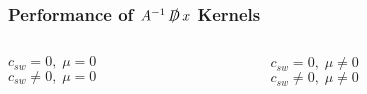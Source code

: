 \documentclass{beamer}
\begin{document}

  \begin{frame}
    \frametitle{Performance of $A^{-1} \, \slashed D \, x $ Kernels}
    \vspace{-5mm}
    \footnotesize

    \begin{columns}[T]
      \begin{column}{.5\textwidth}
        \begin{center}
          $c_{sw} = 0, \; \mu = 0$ \\
          \vfill
          $c_{sw} \neq 0, \; \mu = 0$ \\
          \vfill
        \end{center}
      \end{column}
      \begin{column}{.5\textwidth}
        \begin{center}
          $c_{sw} = 0, \; \mu \neq 0$ \\
          \vfill
          $c_{sw} \neq 0, \; \mu \neq 0$ \\
          \vfill
        \end{center}
      \end{column}
    \end{columns}

  \end{frame}

\end{document}
